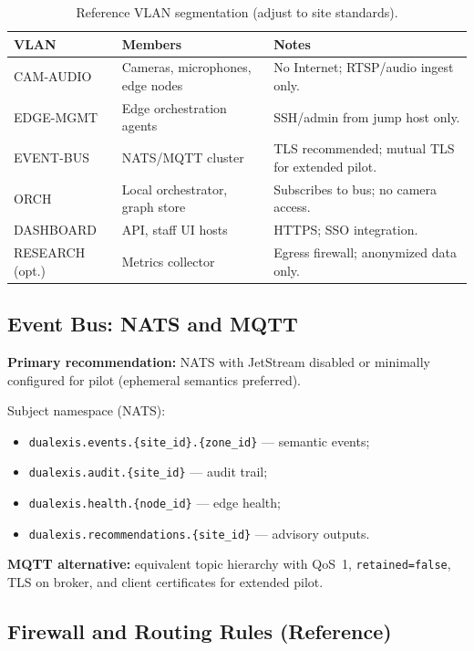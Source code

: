 \begin{table}[htbp]
  \centering
  \caption{Reference VLAN segmentation (adjust to site standards).}
  \label{tab:vlan-model-appendix}
  \small
  \begin{tabular}{@{}p{2.8cm}p{3.4cm}p{5.8cm}@{}}
    \toprule
    VLAN & Members & Notes \\
    \midrule
    CAM-AUDIO &
      Cameras, microphones, edge nodes &
      No Internet; RTSP/audio ingest only. \\
    EDGE-MGMT &
      Edge orchestration agents &
      SSH/admin from jump host only. \\
    EVENT-BUS &
      NATS/MQTT cluster &
      TLS recommended; mutual TLS for extended pilot. \\
    ORCH &
      Local orchestrator, graph store &
      Subscribes to bus; no camera access. \\
    DASHBOARD &
      API, staff UI hosts &
      HTTPS; SSO integration. \\
    RESEARCH (opt.) &
      Metrics collector &
      Egress firewall; anonymized data only. \\
    \bottomrule
  \end{tabular}
\end{table}

\subsection{Event Bus: NATS and MQTT}

\textbf{Primary recommendation:} NATS with JetStream disabled or minimally configured for
pilot (ephemeral semantics preferred).

Subject namespace (NATS):
\begin{itemize}[noitemsep]
  \item \texttt{dualexis.events.\{site\_id\}.\{zone\_id\}} --- semantic events;
  \item \texttt{dualexis.audit.\{site\_id\}} --- audit trail;
  \item \texttt{dualexis.health.\{node\_id\}} --- edge health;
  \item \texttt{dualexis.recommendations.\{site\_id\}} --- advisory outputs.
\end{itemize}

\textbf{MQTT alternative:} equivalent topic hierarchy with QoS~1, \texttt{retained=false},
TLS on broker, and client certificates for extended pilot.

\subsection{Firewall and Routing Rules (Reference)}

